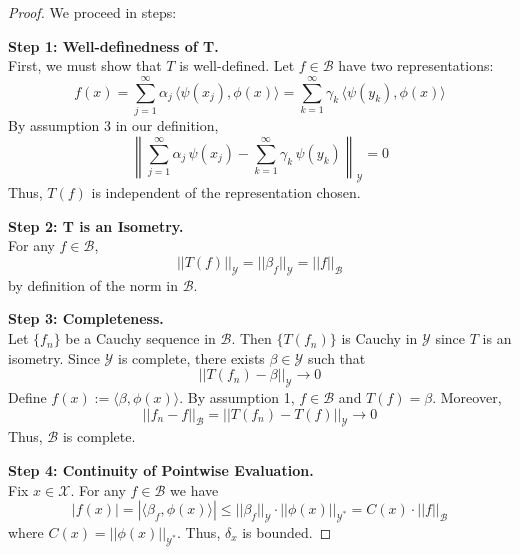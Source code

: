 \begin{proof}
We proceed in steps:

\medskip
\noindent\textbf{Step 1: Well-definedness of T.} \\
First, we must show that $T$ is well-defined. Let $f \in \mathcal{B}$ have two representations:
\begin{equation}
f(x) = \sum_{j=1}^\infty \alpha_j\, \langle \psi(x_j), \phi(x)\rangle = \sum_{k=1}^\infty \gamma_k\, \langle \psi(y_k), \phi(x)\rangle
\end{equation}
By assumption 3 in our definition,
\begin{equation}
\left\|\sum_{j=1}^\infty \alpha_j\, \psi(x_j) - \sum_{k=1}^\infty \gamma_k\, \psi(y_k)\right\|_{\mathcal{Y}} = 0
\end{equation}
Thus, $T(f)$ is independent of the representation chosen.

\medskip
\noindent\textbf{Step 2: T is an Isometry.} \\
For any $f \in \mathcal{B}$,
\begin{equation}
||T(f)||_{\mathcal{Y}} = ||\beta_f||_{\mathcal{Y}} = ||f||_{\mathcal{B}}
\end{equation}
by definition of the norm in $\mathcal{B}$.

\medskip
\noindent\textbf{Step 3: Completeness.} \\
Let $\{f_n\}$ be a Cauchy sequence in $\mathcal{B}$. Then $\{T(f_n)\}$ is Cauchy in $\mathcal{Y}$ since $T$ is an isometry. Since $\mathcal{Y}$ is complete, there exists $\beta \in \mathcal{Y}$ such that
\begin{equation}
||T(f_n) - \beta||_{\mathcal{Y}} \to 0
\end{equation}
Define $f(x) := \langle \beta, \phi(x) \rangle$. By assumption 1, $f \in \mathcal{B}$ and $T(f) = \beta$. Moreover,
\begin{equation}
||f_n - f||_{\mathcal{B}} = ||T(f_n) - T(f)||_{\mathcal{Y}} \to 0
\end{equation}
Thus, $\mathcal{B}$ is complete.

\medskip
\noindent\textbf{Step 4: Continuity of Pointwise Evaluation.} \\
Fix $x\in\mathcal{X}$. For any $f\in\mathcal{B}$ we have
\begin{equation}
|f(x)| = |\langle \beta_f, \phi(x)\rangle| \leq ||\beta_f||_{\mathcal{Y}}\cdot||\phi(x)||_{\mathcal{Y}^*} = C(x)\cdot||f||_{\mathcal{B}}
\end{equation}
where $C(x) = ||\phi(x)||_{\mathcal{Y}^*}$. Thus, $\delta_x$ is bounded.


\end{proof}
